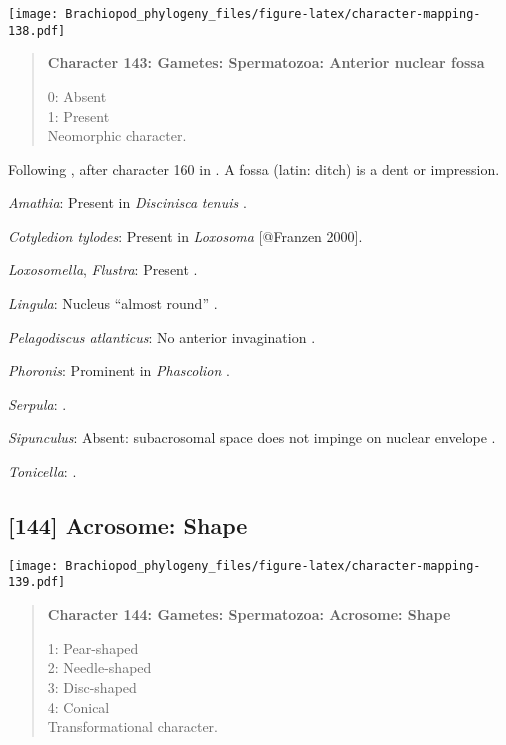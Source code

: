 \documentclass[openany]{book}
\theoremstyle{definition}
\theoremstyle{definition}
\theoremstyle{definition}
\theoremstyle{remark}
\begin{document}
\texttt{[image: Brachiopod\_phylogeny\_files/figure-latex/character-mapping-138.pdf]}

\begin{quote}
\textbf{Character 143: Gametes: Spermatozoa: Anterior nuclear fossa}

0: Absent\\
1: Present\\
Neomorphic character.
\end{quote}

Following \citet{Smith2012}, after character 160 in \citet{Giribet2002}.
A fossa (latin: ditch) is a dent or impression.

\hypertarget{Amathia-coding-143}{}
\emph{Amathia}: Present in \emph{Discinisca} \emph{tenuis}
\citep{Hodgson1994Ultrastructureof}.

\hypertarget{Cotyledion_tylodes-coding-143}{}
\emph{Cotyledion tylodes}: Present in \emph{Loxosoma} {[}@Franzen
2000{]}.

\hypertarget{Flustra-coding-143}{}
\emph{Loxosomella}, \emph{Flustra}: Present \citep[in
\emph{Tubulipora};][]{Franzen1984}.

\hypertarget{Lingula-coding-143}{}
\emph{Lingula}: Nucleus ``almost round''
\citep{Reunov2004Ultrastructuralstudy}.

\hypertarget{Pelagodiscus_atlanticus-coding-143}{}
\emph{Pelagodiscus atlanticus}: No anterior invagination
\citep{Hodgson1994Ultrastructureof}.

\hypertarget{Phoronis-coding-143}{}
\emph{Phoronis}: Prominent in \emph{Phascolion} \citep{Rice1993}.

\hypertarget{Serpula-coding-143}{}
\emph{Serpula}: \citet{BucklandNicks1988}.

\hypertarget{Sipunculus-coding-143}{}
\emph{Sipunculus}: Absent: subacrosomal space does not impinge on
nuclear envelope \citep{Gherardi2011}.

\hypertarget{Tonicella-coding-143}{}
\emph{Tonicella}: \citet{DufresneDube1983}.

\subsection*{{[}144{]} Acrosome: Shape}\label{acrosome-shape}

\texttt{[image: Brachiopod\_phylogeny\_files/figure-latex/character-mapping-139.pdf]}

\begin{quote}
\textbf{Character 144: Gametes: Spermatozoa: Acrosome: Shape}

1: Pear-shaped\\
2: Needle-shaped\\
3: Disc-shaped\\
4: Conical\\
Transformational character.
\end{quote}
\end{document}
